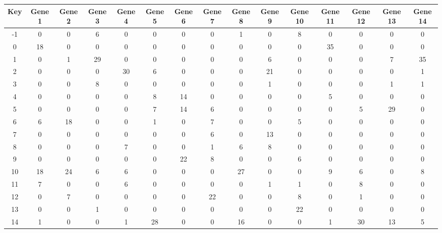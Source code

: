 \begin{tabular}{|c|c|c|c|c|c|c|c|c|c|c|c|c|c|c|}
\hline
Key & Gene 1 & Gene 2 & Gene 3 & Gene 4 & Gene 5 & Gene 6 & Gene 7 & Gene 8 & Gene 9 & Gene 10 & Gene 11 & Gene 12 & Gene 13 & Gene 14 \\
\hline
-1 & 0 & 0 & 6 & 0 & 0 & 0 & 0 & 1 & 0 & 8 & 0 & 0 & 0 & 0 \\
0 & 18 & 0 & 0 & 0 & 0 & 0 & 0 & 0 & 0 & 0 & 35 & 0 & 0 & 0 \\
1 & 0 & 1 & 29 & 0 & 0 & 0 & 0 & 0 & 6 & 0 & 0 & 0 & 7 & 35 \\
2 & 0 & 0 & 0 & 30 & 6 & 0 & 0 & 0 & 21 & 0 & 0 & 0 & 0 & 1 \\
3 & 0 & 0 & 8 & 0 & 0 & 0 & 0 & 0 & 1 & 0 & 0 & 0 & 1 & 1 \\
4 & 0 & 0 & 0 & 0 & 8 & 14 & 0 & 0 & 0 & 0 & 5 & 0 & 0 & 0 \\
5 & 0 & 0 & 0 & 0 & 7 & 14 & 6 & 0 & 0 & 0 & 0 & 5 & 29 & 0 \\
6 & 6 & 18 & 0 & 0 & 1 & 0 & 7 & 0 & 0 & 5 & 0 & 0 & 0 & 0 \\
7 & 0 & 0 & 0 & 0 & 0 & 0 & 6 & 0 & 13 & 0 & 0 & 0 & 0 & 0 \\
8 & 0 & 0 & 0 & 7 & 0 & 0 & 1 & 6 & 8 & 0 & 0 & 0 & 0 & 0 \\
9 & 0 & 0 & 0 & 0 & 0 & 22 & 8 & 0 & 0 & 6 & 0 & 0 & 0 & 0 \\
10 & 18 & 24 & 6 & 6 & 0 & 0 & 0 & 27 & 0 & 0 & 9 & 6 & 0 & 8 \\
11 & 7 & 0 & 0 & 6 & 0 & 0 & 0 & 0 & 1 & 1 & 0 & 8 & 0 & 0 \\
12 & 0 & 7 & 0 & 0 & 0 & 0 & 22 & 0 & 0 & 8 & 0 & 1 & 0 & 0 \\
13 & 0 & 0 & 1 & 0 & 0 & 0 & 0 & 0 & 0 & 22 & 0 & 0 & 0 & 0 \\
14 & 1 & 0 & 0 & 1 & 28 & 0 & 0 & 16 & 0 & 0 & 1 & 30 & 13 & 5 \\
\hline
\end{tabular}